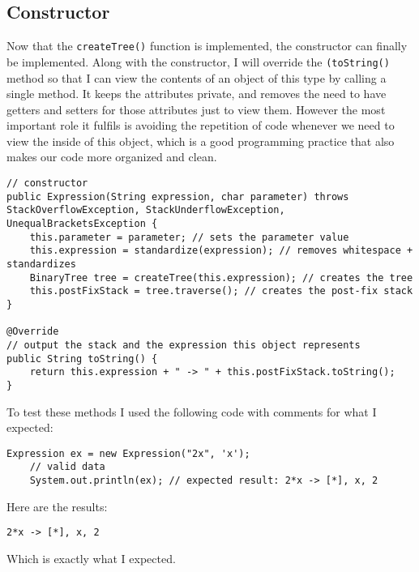 \documentclass[../../../../main.tex]{subfiles}
\begin{document}
\subsection{Constructor}
Now that the \texttt{createTree()} function is implemented, the constructor can finally be implemented. Along with the constructor, I will override the \texttt{(toString()} method so that I can view the contents of an object of this type by calling a single method. It keeps the attributes private, and removes the need to have getters and setters for those attributes just to view them. However the most important role it fulfils is avoiding the repetition of code whenever we need to view the inside of this object, which is a good programming practice that also makes our code more organized and clean.

\begin{verbatim}
// constructor
public Expression(String expression, char parameter) throws StackOverflowException, StackUnderflowException, UnequalBracketsException {
	this.parameter = parameter; // sets the parameter value
	this.expression = standardize(expression); // removes whitespace + standardizes
	BinaryTree tree = createTree(this.expression); // creates the tree
	this.postFixStack = tree.traverse(); // creates the post-fix stack
}

@Override
// output the stack and the expression this object represents
public String toString() {
	return this.expression + " -> " + this.postFixStack.toString();
}
\end{verbatim}
To test these methods I used the following code with comments for what I expected:
\begin{verbatim}
Expression ex = new Expression("2x", 'x');
	// valid data
	System.out.println(ex);	// expected result: 2*x -> [*], x, 2
\end{verbatim}
Here are the results:
\begin{verbatim}
2*x -> [*], x, 2
\end{verbatim}
Which is exactly what I expected.
\newpage
\end{document}
